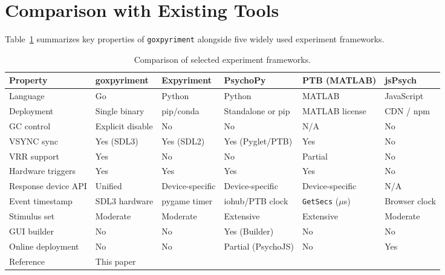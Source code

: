 \documentclass[man,a4paper]{apa7}
\begin{document}
\section{Comparison with Existing Tools}\label{comparison-with-existing-tools}

Table~\ref{tab:comparison} summarizes key properties of \texttt{goxpyriment}
alongside five widely used experiment frameworks.

\begin{table}[tb]
\caption{Comparison of selected experiment frameworks.}
\label{tab:comparison}
\footnotesize
\begin{tabular}{@{}
  >{\raggedright\arraybackslash}p{}
  >{\raggedright\arraybackslash}p{}
  >{\raggedright\arraybackslash}p{}
  >{\raggedright\arraybackslash}p{}
  >{\raggedright\arraybackslash}p{}
  >{\raggedright\arraybackslash}p{}@{}}
\toprule
Property & goxpyriment & Expyriment & PsychoPy & PTB (MATLAB) & jsPsych \\
\midrule
Language        & Go           & Python        & Python            & MATLAB           & JavaScript \\
Deployment      & Single binary & pip/conda    & Standalone or pip & MATLAB license   & CDN / npm \\
GC control      & Explicit disable & No        & No                & N/A              & No \\
VSYNC sync      & Yes (SDL3)   & Yes (SDL2)    & Yes (Pyglet/PTB)  & Yes              & No \\
VRR support     & Yes          & No            & No                & Partial          & No \\
Hardware triggers & Yes        & Yes           & Yes               & Yes              & No \\
Response device API & Unified  & Device-specific & Device-specific & Device-specific & N/A \\
Event timestamp & SDL3 hardware & pygame timer & iohub/PTB clock  & \texttt{GetSecs} ($\mu$s) & Browser clock \\
Stimulus set    & Moderate     & Moderate      & Extensive         & Extensive        & Moderate \\
GUI builder     & No           & No            & Yes (Builder)     & No               & No \\
Online deployment & No         & No            & Partial (PsychoJS) & No              & Yes \\
Reference       & This paper   & \cite{krause2014} & \cite{peirce2019} & \cite{brainard1997} & \cite{deleeuw2023} \\
\bottomrule
\end{tabular}
\end{table}
\end{document}
